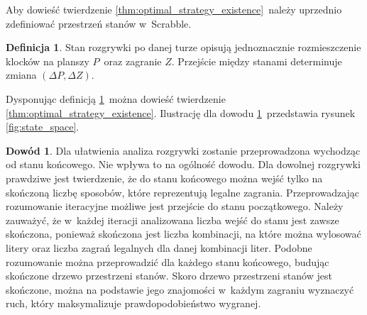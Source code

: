 \documentclass[a4paper,twocolumn,12pt]{article}
\theoremstyle{definition}
\newtheorem{definition}{Definicja}
\newtheorem{pro}{Dowód}
\begin{document}
Aby dowieść twierdzenie \ref{thm:optimal_strategy_existence}~należy uprzednio zdefiniować przestrzeń stanów w~Scrabble.

\begin{definition}
	Stan rozgrywki po danej turze opisują jednoznacznie rozmieszczenie klocków na planszy $P$~oraz zagranie $Z$. Przejście między stanami determinuje zmiana $(\Delta P, \Delta Z)$.
	\label{def:scrabble_state_space}
\end{definition}

Dysponując definicją \ref{def:scrabble_state_space}~można dowieść twierdzenie \ref{thm:optimal_strategy_existence}. Ilustrację dla dowodu \ref{pro:optimal_strategy_existence}~przedstawia rysunek \ref{fig:state_space}.

\begin{pro}
	Dla ułatwienia analiza rozgrywki zostanie przeprowadzona wychodząc od stanu końcowego. Nie wpływa to na ogólność dowodu. Dla dowolnej rozgrywki prawdziwe jest twierdzenie, że do stanu końcowego można wejść tylko na skończoną liczbę sposobów, które reprezentują legalne zagrania. Przeprowadzając rozumowanie iteracyjne możliwe jest przejście do stanu początkowego. Należy zauważyć, że w~każdej iteracji analizowana liczba wejść do stanu jest zawsze skończona, ponieważ skończona jest liczba kombinacji, na które można wylosować litery oraz liczba zagrań legalnych dla danej kombinacji liter. Podobne rozumowanie można przeprowadzić dla każdego stanu końcowego, budując skończone drzewo przestrzeni stanów. Skoro drzewo przestrzeni stanów jest skończone, można na podstawie jego znajomości w~każdym zagraniu wyznaczyć ruch, który maksymalizuje prawdopodobieństwo wygranej.
	\label{pro:optimal_strategy_existence}
\end{pro}
\end{document}
